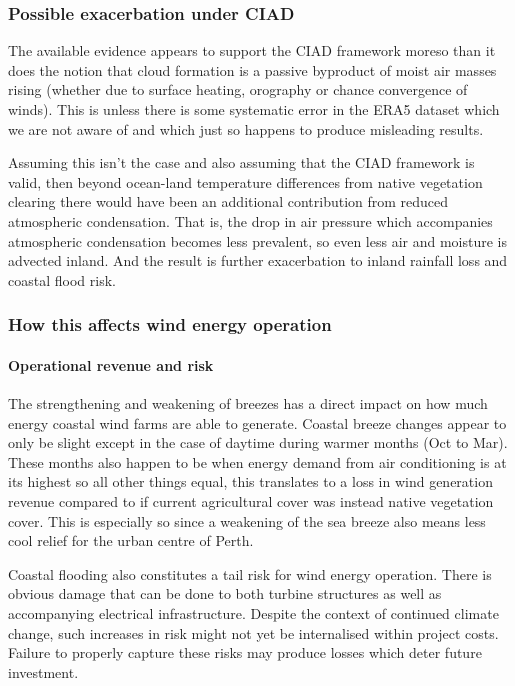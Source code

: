 \subsubsection{Possible exacerbation under CIAD}

The available evidence appears to support the \ac{CIAD} framework moreso than it does the notion that cloud formation is a passive byproduct of moist air masses rising (whether due to surface heating, orography or chance convergence of winds). This is unless there is some systematic error in the \ac{ERA5} dataset which we are not aware of and which just so happens to produce misleading results.

Assuming this isn't the case and also assuming that the \ac{CIAD} framework is valid, then beyond ocean-land temperature differences from native vegetation clearing there would have been an additional contribution from reduced atmospheric condensation. That is, the drop in air pressure which accompanies atmospheric condensation becomes less prevalent, so even less air and moisture is advected inland. And the result is further exacerbation to inland rainfall loss and coastal flood risk.

\subsubsection{How this affects wind energy operation}

\paragraph{Operational revenue and risk}

The strengthening and weakening of breezes has a direct impact on how much energy coastal wind farms are able to generate. Coastal breeze changes appear to only be slight except in the case of daytime during warmer months (Oct to Mar). These months also happen to be when energy demand from air conditioning is at its highest so all other things equal, this translates to a loss in wind generation revenue compared to if current agricultural cover was instead native vegetation cover. This is especially so since a weakening of the sea breeze also means less cool relief for the urban centre of Perth.

Coastal flooding also constitutes a tail risk for wind energy operation. There is obvious damage that can be done to both turbine structures as well as accompanying electrical infrastructure. Despite the context of continued climate change, such increases in risk might not yet be internalised within project costs. Failure to properly capture these risks may produce losses which deter future investment.

